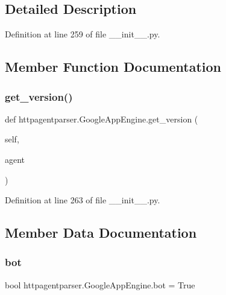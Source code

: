 \subsection{Detailed Description}


Definition at line 259 of file \+\_\+\+\_\+init\+\_\+\+\_\+.\+py.



\subsection{Member Function Documentation}
\hypertarget{classhttpagentparser_1_1_google_app_engine_a81ab551ca71245743c9a20a1c53550e6}{}\label{classhttpagentparser_1_1_google_app_engine_a81ab551ca71245743c9a20a1c53550e6} 
\subsubsection{\texorpdfstring{get\+\_\+version()}{get\_version()}}
{\footnotesize\ttfamily def httpagentparser.\+Google\+App\+Engine.\+get\+\_\+version (\begin{DoxyParamCaption}\item[{}]{self,  }\item[{}]{agent }\end{DoxyParamCaption})}



Definition at line 263 of file \+\_\+\+\_\+init\+\_\+\+\_\+.\+py.



\subsection{Member Data Documentation}
\hypertarget{classhttpagentparser_1_1_google_app_engine_ab435728ddc372e1ef8050c7ea52ae815}{}\label{classhttpagentparser_1_1_google_app_engine_ab435728ddc372e1ef8050c7ea52ae815} 
\subsubsection{\texorpdfstring{bot}{bot}}
{\footnotesize\ttfamily bool httpagentparser.\+Google\+App\+Engine.\+bot = True\hspace{0.3cm}{\ttfamily [static]}}




